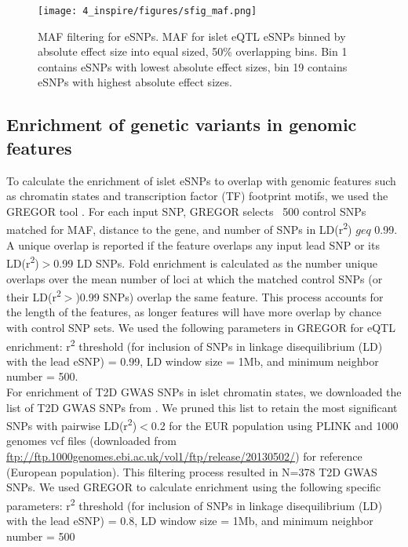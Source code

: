 \begin{figure}
    \centering
    \texttt{[image: 4\_inspire/figures/sfig\_maf.png]}
    \caption[Islet eQTL SNP MAF vs effect size]{MAF filtering for eSNPs. MAF for islet eQTL eSNPs binned by absolute effect size into equal sized, 50\% overlapping bins. Bin 1 contains eSNPs with lowest absolute effect sizes, bin 19 contains eSNPs with highest absolute effect sizes.}
    \label{fig:c4_sf_maf}
  \end{figure}

\subsection{Enrichment of genetic variants in genomic features}
To calculate the enrichment of islet eSNPs to overlap with genomic features such as chromatin states and transcription factor (TF) footprint motifs, we used the GREGOR tool \cite{schmidtGREGOREvaluatingGlobal2015}. For each input SNP, GREGOR selects ~500 control SNPs matched for MAF, distance to the gene, and number of SNPs in LD(r\textsuperscript{2}) $geq$ 0.99. A unique overlap is reported if the feature overlaps any input lead SNP or its LD(r\textsuperscript{2})$>$0.99 LD SNPs. Fold enrichment is calculated as the number unique overlaps over the mean number of loci at which the matched control SNPs (or their LD(r\textsuperscript{2}$>$)0.99 SNPs) overlap the same feature. This process accounts for the length of the features, as longer features will have more overlap by chance with control SNP sets. We used the following parameters in GREGOR for eQTL enrichment: r\textsuperscript{2} threshold (for inclusion of SNPs in linkage disequilibrium (LD) with the lead eSNP) = 0.99, LD window size = 1Mb, and minimum neighbor number = 500. \\

For enrichment of T2D GWAS SNPs in islet chromatin states, we downloaded the list of T2D GWAS  SNPs from \cite{mahajanFinemappingTypeDiabetes2018}. We pruned this list to retain the most significant SNPs with pairwise LD(r\textsuperscript{2})$<$0.2 for the EUR population using PLINK \cite{changSecondgenerationPLINKRising2015} and 1000 genomes vcf files (downloaded from \url{ftp://ftp.1000genomes.ebi.ac.uk/vol1/ftp/release/20130502/}) for reference (European population). This filtering process resulted in N=378 T2D GWAS SNPs. We used GREGOR to calculate enrichment using the following specific parameters: r\textsuperscript{2} threshold (for inclusion of SNPs in linkage disequilibrium (LD) with the lead eSNP) = 0.8, LD window size = 1Mb, and minimum neighbor number = 500 \\

